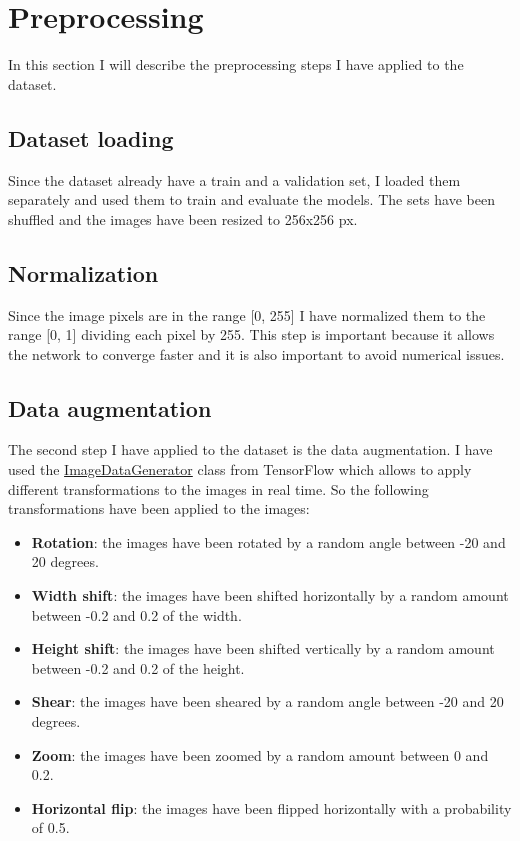 \section{Preprocessing} \label{sec:preprocessing}
In this section I will describe the preprocessing steps I have applied to the dataset.

\subsection{Dataset loading} \label{sec:preprocessing-dataset-loading}
Since the dataset already have a train and a validation set, I loaded them separately and used them to train and evaluate the models.
The sets have been shuffled and the images have been resized to 256x256 px.

\subsection{Normalization} \label{sec:preprocessing-normalization}
Since the image pixels are in the range [0, 255] I have normalized them to the range [0, 1] dividing each pixel by 255.
This step is important because it allows the network to converge faster and it is also important to avoid numerical issues.

\subsection{Data augmentation} \label{sec:preprocessing-data-augmentation}
The second step I have applied to the dataset is the data augmentation.
I have used the \href{https://www.tensorflow.org/api_docs/python/tf/keras/preprocessing/image/ImageDataGenerator}{ImageDataGenerator} class from TensorFlow which allows to apply different transformations to the images in real time.
So the following transformations have been applied to the images:
\begin{itemize}
    \item \textbf{Rotation}: the images have been rotated by a random angle between -20 and 20 degrees.
    \item \textbf{Width shift}: the images have been shifted horizontally by a random amount between -0.2 and 0.2 of the width.
    \item \textbf{Height shift}: the images have been shifted vertically by a random amount between -0.2 and 0.2 of the height.
    \item \textbf{Shear}: the images have been sheared by a random angle between -20 and 20 degrees.
    \item \textbf{Zoom}: the images have been zoomed by a random amount between 0 and 0.2.
    \item \textbf{Horizontal flip}: the images have been flipped horizontally with a probability of 0.5.
\end{itemize}

